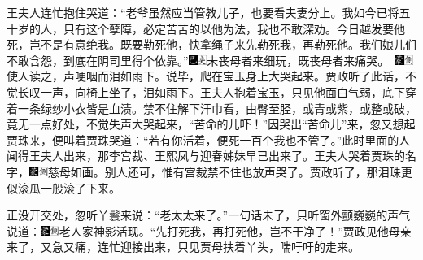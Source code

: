 王夫人连忙抱住哭道：``老爷虽然应当管教儿子，也要看夫妻分上。我如今已将五十岁的人，只有这个孽障，必定苦苦的以他为法，我也不敢深劝。今日越发要他死，岂不是有意绝我。既要勒死他，快拿绳子来先勒死我，再勒死他。我们娘儿们不敢含怨，到底在阴司里得个依靠。''{\includegraphics[width=3mm]{../Images/00003}\includegraphics[width=3mm]{../Images/00012}\footnotesize \kaishu 未丧母者来细玩，既丧母者来痛哭。　\includegraphics[width=3mm]{../Images/00006}\includegraphics[width=3mm]{../Images/00011}\footnotesize \kaishu 使人读之，声哽咽而泪如雨下。}说毕，爬在宝玉身上大哭起来。贾政听了此话，不觉长叹一声，向椅上坐了，泪如雨下。王夫人抱着宝玉，只见他面白气弱，底下穿着一条绿纱小衣皆是血渍。禁不住解下汗巾看，由臀至胫，或青或紫，或整或破，竟无一点好处，不觉失声大哭起来，``苦命的儿吓！''因哭出``苦命儿''来，忽又想起贾珠来，便叫着贾珠哭道：``若有你活着，便死一百个我也不管了。''此时里面的人闻得王夫人出来，那李宫裁、王熙凤与迎春姊妹早已出来了。王夫人哭着贾珠的名字，{\includegraphics[width=3mm]{../Images/00006}\includegraphics[width=3mm]{../Images/00011}\footnotesize \kaishu 慈母如画。}别人还可，惟有宫裁禁不住也放声哭了。贾政听了，那泪珠更似滚瓜一般滚了下来。

正没开交处，忽听丫鬟来说：``老太太来了。''一句话未了，只听窗外颤巍巍的声气说道：{\includegraphics[width=3mm]{../Images/00006}\includegraphics[width=3mm]{../Images/00011}\footnotesize \kaishu 老人家神影活现。}``先打死我，再打死他，岂不干净了！''贾政见他母亲来了，又急又痛，连忙迎接出来，只见贾母扶着丫头，喘吁吁的走来。

